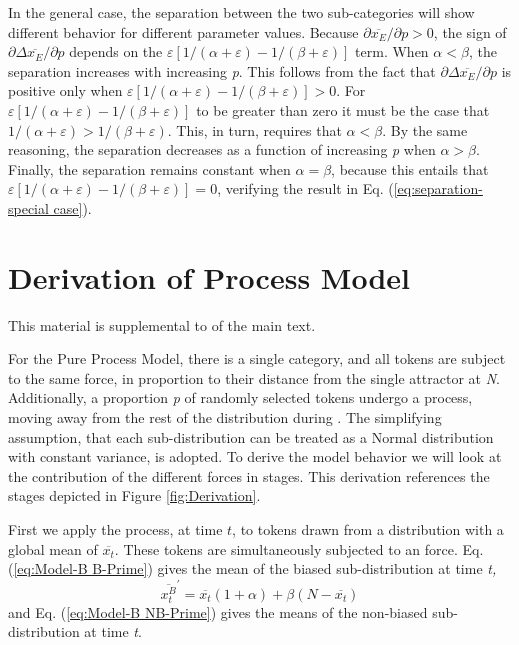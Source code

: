 In the general case, the separation between the two sub-categories
will show different behavior for different parameter values. Because
${\partial\overline{x_{E}}}/{\partial p}>0$, the sign of ${\partial\Delta\overline{x_{E}}}/{\partial p}$
depends on the $\varepsilon[{1}/({\alpha+\varepsilon})-{1}/({\beta+\varepsilon})]$
term. When $\alpha<\beta$, the separation increases with increasing
\emph{p}. This follows from the fact that ${\partial\Delta\overline{x_{E}}}/{\partial p}$
is positive only when $\varepsilon[{1}/({\alpha+\varepsilon})-{1}/({\beta+\varepsilon})]>0$.
For $\varepsilon[{1}/({\alpha+\varepsilon})-{1}/({\beta+\varepsilon})]$
to be greater than zero it must be the case that ${1}/({\alpha+\varepsilon})>{1}/({\beta+\varepsilon})$.
This, in turn, requires that $\alpha<\beta$. By the same reasoning,
the separation decreases as a function of increasing \emph{p} when
$\alpha>\beta$. Finally, the separation remains constant when $\alpha=\beta$,
because this entails that $\varepsilon[{1}/({\alpha+\varepsilon})-{1}/({\beta+\varepsilon})]=0$,
verifying the result in Eq. (\ref{eq:separation-special case}).

\chapter{\label{chap:Appendix D}Derivation of Process Model}

This material is supplemental to 
of the main text.

For the Pure Process Model, there is a single category, and all tokens
are subject to the same  force, in proportion to their distance
from the single attractor at \emph{N}. Additionally, a proportion
\emph{p} of randomly selected tokens undergo a  process,
moving away from the rest of the distribution during . The
simplifying assumption, that each sub-distribution can be treated
as a Normal distribution with constant variance, is adopted. To derive
the model behavior we will look at the contribution of the different
forces in stages. This derivation references the stages depicted in
Figure \ref{fig:Derivation}.

First we apply the  process, at time $t$, to tokens drawn
from a distribution with a global mean of $\overline{x_{t}}$. These
tokens are simultaneously subjected to an  force. Eq. (\ref{eq:Model-B B-Prime})
gives the mean of the biased sub-distribution at time \emph{t,}
\begin{equation}
\overline{x_{t}^{B}}^{\prime}=\overline{x_{t}}(1+\alpha)+\beta(N-\overline{x_{t}})\label{eq:Model-B B-Prime}
\end{equation}
and Eq. (\ref{eq:Model-B NB-Prime}) gives the means of the non-biased
sub-distribution at time \emph{t}.

